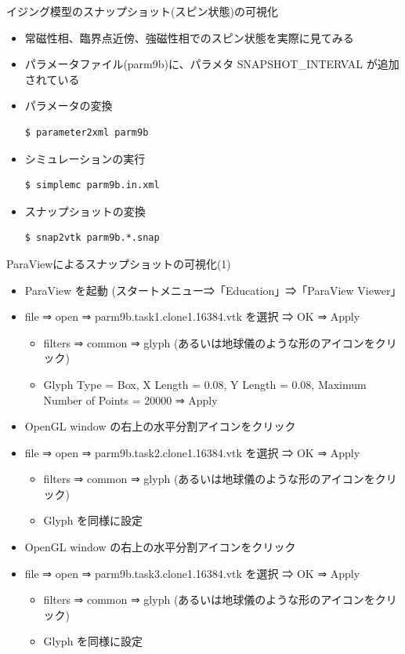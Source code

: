\begin{frame}[t,fragile]{イジング模型のスナップショット(スピン状態)の可視化}
  \begin{itemize}
  \item 常磁性相、臨界点近傍、強磁性相でのスピン状態を実際に見てみる
  \item パラメータファイル(parm9b)に、パラメタ SNAPSHOT\_INTERVAL が追加されている
  \item パラメータの変換
\begin{lstlisting}
$ parameter2xml parm9b
\end{lstlisting}
  \item シミュレーションの実行
\begin{lstlisting}
$ simplemc parm9b.in.xml
\end{lstlisting}
\item スナップショットの変換
\begin{lstlisting}
$ snap2vtk parm9b.*.snap
\end{lstlisting}
  \end{itemize}
\end{frame}

\begin{frame}[t,fragile]{ParaViewによるスナップショットの可視化(1)}
  \begin{itemize}
  \item ParaView を起動 (スタートメニュー⇒「Education」⇒「ParaView Viewer」
  \item file ⇒ open ⇒ parm9b.task1.clone1.16384.vtk を選択 ⇒ OK ⇒ Apply
    \begin{itemize}
    \item filters ⇒ common ⇒ glyph (あるいは地球儀のような形のアイコンをクリック)
    \item Glyph Type = Box, X Length = 0.08, Y Length = 0.08, Maximum Number of Points = 20000 ⇒ Apply
    \end{itemize}
  \item OpenGL window の右上の水平分割アイコンをクリック
  \item file ⇒ open ⇒ parm9b.task2.clone1.16384.vtk を選択 ⇒ OK ⇒ Apply
    \begin{itemize}
    \item filters ⇒ common ⇒ glyph (あるいは地球儀のような形のアイコンをクリック)
    \item Glyph を同様に設定
    \end{itemize}
  \item OpenGL window の右上の水平分割アイコンをクリック
  \item file ⇒ open ⇒ parm9b.task3.clone1.16384.vtk を選択 ⇒ OK ⇒ Apply
    \begin{itemize}
      \item filters ⇒ common ⇒ glyph (あるいは地球儀のような形のアイコンをクリック)
      \item Glyph を同様に設定
    \end{itemize}
  \end{itemize}
\end{frame}


